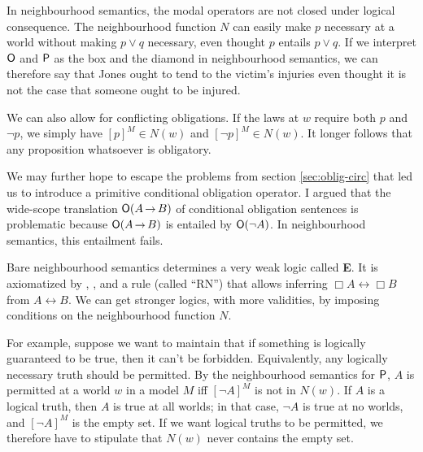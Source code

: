 In neighbourhood semantics, the modal operators are not closed under logical
consequence. The neighbourhood function $N$ can easily make $p$ necessary at a
world without making $p\lor q$ necessary, even thought $p$ entails $p \lor q$.
If we interpret $\operatorname{\mathsf{O}}$ and $\operatorname{\mathsf{P}}$ as the box and the diamond in neighbourhood
semantics, we can therefore say that Jones ought to tend to the victim's
injuries even thought it is not the case that someone ought to be injured.


We can also allow for conflicting obligations. If the laws at $w$ require both
$p$ and $\neg p$, we simply have $[p]^M \in N(w)$ and $[\neg p]^M \in N(w)$. It
longer follows that any proposition whatsoever is obligatory.

We may further hope to escape the problems from section \ref{sec:oblig-circ}
that led us to introduce a primitive conditional obligation operator. I argued
that the wide-scope translation $\Ob(A \to B)$ of conditional obligation
sentences is problematic because $\Ob(A \to B)$ is entailed by $\operatorname{\mathsf{O}}(\neg A)$. In
neighbourhood semantics, this entailment fails. 

Bare neighbourhood semantics determines a very weak logic called \textbf{E}. It
is axiomatized by , , and a rule (called ``RN'') that allows
inferring $\Box A \leftrightarrow \Box B$ from $A \leftrightarrow B$. We can get
stronger logics, with more validities, by imposing conditions on the
neighbourhood function $N$.

For example, suppose we want to maintain that if something is logically
guaranteed to be true, then it can't be forbidden. Equivalently, any logically
necessary truth should be permitted. By the neighbourhood semantics for $\operatorname{\mathsf{P}}$,
$A$ is permitted at a world $w$ in a model $M$ iff $[\neg A]^M$ is not in
$N(w)$. If $A$ is a logical truth, then $A$ is true at all worlds; in that case,
$\neg A$ is true at no worlds, and $[\neg A]^M$ is the empty set. If we want
logical truths to be permitted, we therefore have to stipulate that $N(w)$
never contains the empty set.

